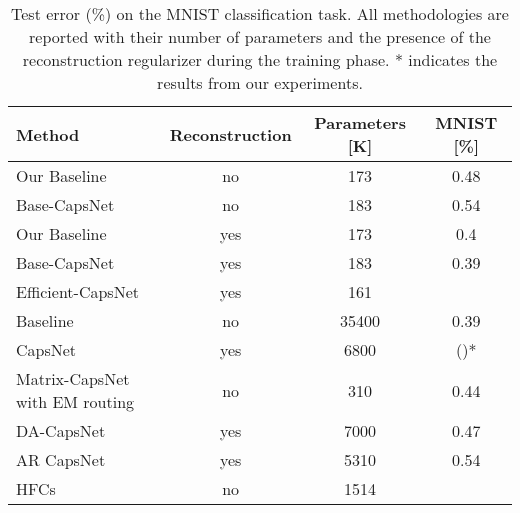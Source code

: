 \documentclass{article}
\begin{document}
\begin{table}[h!]
\centering
\begin{tabular}{lccc}
\toprule
Method            & Reconstruction & Parameters {[}K{]} & MNIST {[}\%{]}                  \\ \hline
Our Baseline      & no              & 173                & 0.48                        \\ 
Base-CapsNet      & no              & 183                & 0.54                        \\ 
Our Baseline      & yes              & 173                & 0.4                         \\ 
Base-CapsNet       & yes              & 183                & 0.39                        \\ 
Efficient-CapsNet & yes              & 161                &               \\ \hline
Baseline \cite{sabour2017dynamic}          & no              & 35400              & 0.39                        \\ 
CapsNet \cite{sabour2017dynamic}           & yes              & 6800               &  ()* \\
Matrix-CapsNet with EM routing \cite{hinton2018matrix}  & no              & 310               & 0.44                        \\ 
DA-CapsNet \cite{huang2020capsnet}        & yes              & 7000               & 0.47                        \\ 
AR CapsNet \cite{choi2019attention} & yes & 5310 & 0.54 \\
HFCs \cite{byerly2020branching}              & no              & 1514               &               \\ \bottomrule
\end{tabular}
\caption{Test error (\%) on the MNIST classification task. All methodologies are reported with their number of parameters and the presence of the reconstruction regularizer during the training phase. * indicates the results from our experiments.}
\label{tab:mnist_results}
\end{table}
\end{document}
